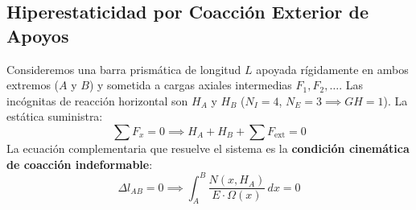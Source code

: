 \subsection{Hiperestaticidad por Coacción Exterior de Apoyos}

Consideremos una barra prismática de longitud $L$ apoyada rígidamente en ambos extremos ($A$ y $B$) y sometida a cargas axiales intermedias $F_1, F_2, \dots$. Las incógnitas de reacción horizontal son $H_A$ y $H_B$ ($N_I = 4$, $N_E = 3 \implies GH = 1$). La estática suministra:
\begin{equation}
    \sum F_x = 0 \implies H_A + H_B + \sum F_{\text{ext}} = 0
\end{equation}
La ecuación complementaria que resuelve el sistema es la \textbf{condición cinemática de coacción indeformable}:
\begin{equation}
    \Delta l_{AB} = 0 \implies \int_A^B \frac{N(x, H_A)}{E \cdot \Omega(x)} \, dx = 0
\end{equation}

